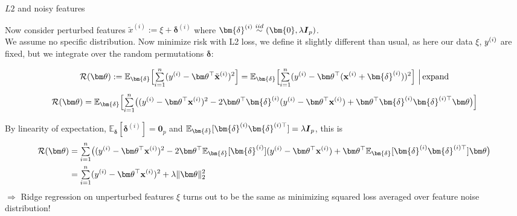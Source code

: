 \documentclass[11pt,compress,t,notes=noshow, xcolor=table]{beamer}
\begin{document}
\begin{vbframe}{$L2$ and noisy features}
\begin{footnotesize}
Now consider perturbed features $ \tilde{x}^{(i)}:= \xi + \bm{\delta}^{(i)}$ where $\bm{\delta}^{(i)} \overset{iid}{\sim} (\bm{0},\lambda \id_p)$. \\
We assume no specific distribution. Now minimize risk with L2 loss, we define it slightly different than usual, as here our data $\xi$, $y^{(i)}$ are fixed, but we integrate over the random permutations $\bm{\delta}$:


$$\riskt:= \mathbb{E}_{\bm{\delta}}\Big[{\textstyle \sumin}(\yi-\thetav^{\top}\tilde{\xv}^{(i)})^2\Big] = \mathbb{E}_{\bm{\delta}}\Big[{\textstyle \sumin}(\yi-\thetav^{\top}(\xi+\bm{\delta}^{(i)}))^2\Big]\,\,\Big|\, \text{expand}$$
\vspace{-0.2cm}
$$\riskt = \mathbb{E}_{\bm{\delta}}\Big[{\textstyle \sumin}\big((\yi-\thetav^{\top}\xi)^2 - 2 \thetav^{\top}\bm{\delta}^{(i)}(\yi-\thetav^{\top}\xi) + \thetav^{\top}\bm{\delta}^{(i)}\bm{{\delta}}^{(i) \top}\thetav\big)\Big]$$

By linearity of expectation, $\mathbb{E}_{\bm{\delta}}[\bm{\delta}^{(i)}]=\bm{0}_p$ and $\mathbb{E}_{\bm{\delta}}[\bm{\delta}^{(i)}\bm{\delta}^{(i)\top}]=\lambda \id_p$, this is
\vspace{-0.2cm}
%
\begin{align*}\riskt&={\textstyle \sumin}\big((\yi-\thetav^{\top}\xi)^2 - 2 \thetav^{\top}\mathbb{E}_{\bm{\delta}}[\bm{\delta}^{(i)}](\yi-\thetav^{\top}\xi) + \thetav^{\top}\mathbb{E}_{\bm{\delta}}[\bm{\delta}^{(i)}\bm{\delta}^{(i)\top}]\thetav \big) \\
&= {\textstyle \sumin}(\yi-\thetav^{\top}\xi)^2+\lambda \Vert \thetav \Vert_2^2
\end{align*}
$\Longrightarrow$ Ridge regression on unperturbed features {\small $\xi$} turns out to be the same as minimizing squared loss averaged over feature noise distribution!

\end{footnotesize}

\end{vbframe}



\endlecture
\end{document}

